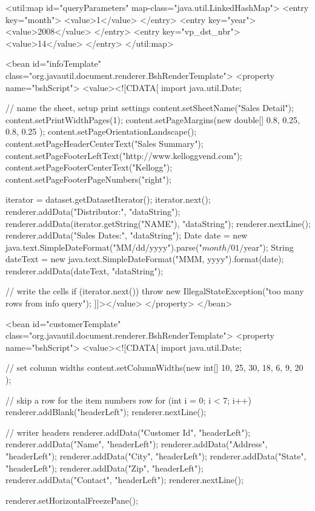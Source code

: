 \documentclass[letterpaper,10pt]{article}
\begin{document}
\begin{verbatimtab}
<util:map id="queryParameters" map-class="java.util.LinkedHashMap">
	<entry key="month">
		<value>1</value>
	</entry>
	<entry key="year">
		<value>2008</value>
	</entry>
	<entry key="vp_dst_nbr">
		<value>14</value>
	</entry>
</util:map>
	
<bean id="infoTemplate" class="org.javautil.document.renderer.BshRenderTemplate">		
	<property name="bshScript">
		<value><![CDATA[
import java.util.Date;
	
	// name the sheet, setup print settings
	content.setSheetName("Sales Detail");
	content.setPrintWidthPages(1);
	content.setPageMargins(new double[] { 0.8, 0.25, 0.8, 0.25 });
	content.setPageOrientationLandscape();
	content.setPageHeaderCenterText("Sales Summary");
	content.setPageFooterLeftText("http://www.kelloggvend.com");
	content.setPageFooterCenterText("Kellogg");
	content.setPageFooterPageNumbers("right");
	
	iterator = dataset.getDatasetIterator();
	iterator.next();
	renderer.addData("Distributor:", "dataString");	
	renderer.addData(iterator.getString("NAME"), "dataString");
	renderer.nextLine();
	renderer.addData("Sales Dates:", "dataString");
	Date date = new java.text.SimpleDateFormat("MM/dd/yyyy").parse("${month}/01/${year}");
	String dateText = new java.text.SimpleDateFormat("MMM, yyyy").format(date);	
	renderer.addData(dateText, "dataString");
	
	// write the cells
	if (iterator.next()) {
		throw new IllegalStateException("too many rows from info query");
	}
		]]></value>
		</property>
</bean>

<bean id="customerTemplate" class="org.javautil.document.renderer.BshRenderTemplate">
	<property name="bshScript">
		<value><![CDATA[
import java.util.Date;
	
	// set column widths
	content.setColumnWidths(new int[] { 10, 25, 30, 18, 6, 9, 20 });
	
	// skip a row for the item numbers row
	for (int i = 0; i < 7; i++) {
		renderer.addBlank("headerLeft");
	}
	renderer.nextLine();
	
	// writer headers
	renderer.addData("Customer Id", "headerLeft");
	renderer.addData("Name", "headerLeft");
	renderer.addData("Address", "headerLeft");
	renderer.addData("City", "headerLeft");
	renderer.addData("State", "headerLeft");
	renderer.addData("Zip", "headerLeft");
	renderer.addData("Contact", "headerLeft");
	renderer.nextLine();
		
	renderer.setHorizontalFreezePane();
	

\end{verbatimtab}
\end{document}

